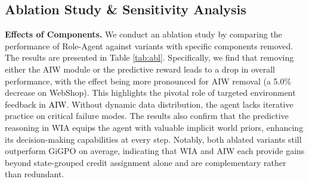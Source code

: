 \documentclass[11pt]{article}
\begin{document}
\subsection{Ablation Study \& Sensitivity Analysis}\label{assa}
\noindent\textbf{Effects of Components.} We conduct an ablation study by comparing the performance of Role-Agent against variants with specific components removed. The results are presented in Table \ref{tab:abl}. Specifically, we find that removing either the AIW  module or the predictive reward leads to a drop in overall performance, with the effect being more pronounced for AIW removal (a 5.0\% decrease on WebShop). This highlights the pivotal role of targeted environment feedback in \textcolor{black}{AIW}. Without dynamic data distribution, the agent lacks iterative practice on critical failure modes. The results also confirm that the predictive reasoning in WIA equips the agent with valuable implicit world priors, enhancing its decision-making capabilities at every step. Notably, both ablated variants still outperform GiGPO on average, indicating that WIA and AIW each provide gains beyond state-grouped credit assignment alone and are complementary rather than redundant. 

 


\begin{table}[t]
\begin{center} 
\vspace{-0.2cm}
\renewcommand{\arraystretch}{1}   
\setlength\tabcolsep{7pt} 
\end{center}
\vspace{-0.4cm}
\caption{Sensitivity Analysis of hyper-parameters with Qwen2.5-1.5B-Instruct. ($H\ge1$ and is rounded).}\label{tab:sense} 
\vspace{-0.5cm}
\end{table}
\end{document}
